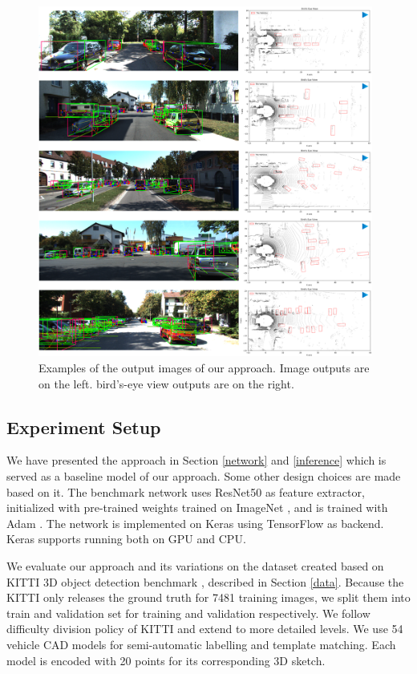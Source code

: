 \documentclass[a4paper,12pt]{article}
\begin{document}
\begin{figure}[H]		
	\includegraphics[width=0.98\textwidth]{res_img2.png}
	\caption[Examples of the output images of our approach.]{Examples of the output images of our approach. Image outputs are on the left. bird's-eye view outputs are on the right.}
	\centering
	\label{figure:res_img}
\end{figure}

\subsection{Experiment Setup}
\label{setup}

We have presented the approach in Section \ref{network} and \ref{inference} which is served as a baseline model of our approach. Some other design choices are made based on it. The benchmark network uses ResNet50 \cite{DBLP:journals/corr/HeZRS15} as feature extractor, initialized with pre-trained weights trained on ImageNet \cite{DBLP:Russakovsky14}, and is trained with Adam \cite{DBLP:journals/corr/KingmaB14}. The network is implemented on Keras \cite{chollet2015keras} using TensorFlow \cite{tensorflow2015-whitepaper} as backend. Keras supports running both on GPU and CPU. 

We evaluate our approach and its variations on the dataset created based on KITTI 3D object detection benchmark \cite{Geiger2012CVPR}, described in Section \ref{data}. Because the KITTI only releases the ground truth for 7481 training images, we split them into train and validation set for training and validation respectively. We follow difficulty division policy of  KITTI and extend to more detailed levels. We use 54 vehicle CAD models \cite{NIPS2012_4562} for semi-automatic labelling and template matching. Each model is encoded with 20 points for its corresponding 3D sketch.
\end{document}
